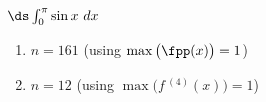 {$\ds \int_{0}^{\pi} \sin x \ dx$}
{\begin{enumerate}
\item		$n=161$ (using $\max\big(\fpp(x)\big)=1$)
\item		$n=12$	(using $\max\big(f\,^{(4)}(x)\big)=1$)
\end{enumerate}
}